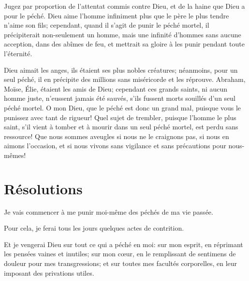 \documentclass[instructions.tex]{subfiles}
\begin{document}
Jugez par proportion de l'attentat commis contre Dieu, et de la haine que Dieu a pour le péché. Dieu aime l'homme infiniment plus que le père le plus tendre n'aime son fils; cependant, quand il s'agit de punir le péché mortel, il précipiterait non-seulement un homme, mais une infinité d'hommes sans aucune acception, dans des abîmes de feu, et mettrait sa gloire à les punir pendant toute l'éternité.

Dieu aimait les anges, ils étaient ses plus nobles créatures; néanmoins, pour un seul péché, il en précipite des millions sans miséricorde et les réprouve. Abraham, Moïse, Élie, étaient les amis de Dieu; cependant ces grands saints, ni aucun homme juste, n'eussent jamais été sauvés, s'ils fussent morts souillés d'un seul péché mortel. O mon Dieu, que le péché est donc un grand mal, puisque vous le punissez avec tant de rigueur! Quel sujet de trembler, puisque l'homme le plus saint, s'il vient à tomber et à mourir dans un seul péché mortel, est perdu sans ressource! Que nous sommes aveugles si nous ne le craignons pas, si nous en aimons l'occasion, et si nous vivons sans vigilance et sans précautions pour nous-mêmes!


\section{Résolutions}

Je vais commencer à me punir moi-même des péchés de ma vie passée.

\primo Pour cela, je ferai tous les jours quelques actes de contrition.

\secundo Et je vengerai Dieu sur tout ce qui a péché en moi: sur mon esprit, en réprimant les pensées vaines et inutiles; sur mon cœur, en le remplissant de sentimens de douleur pour mes transgressions; et sur toutes mes facultés corporelles, en leur imposant des privations utiles.

\end{document}
